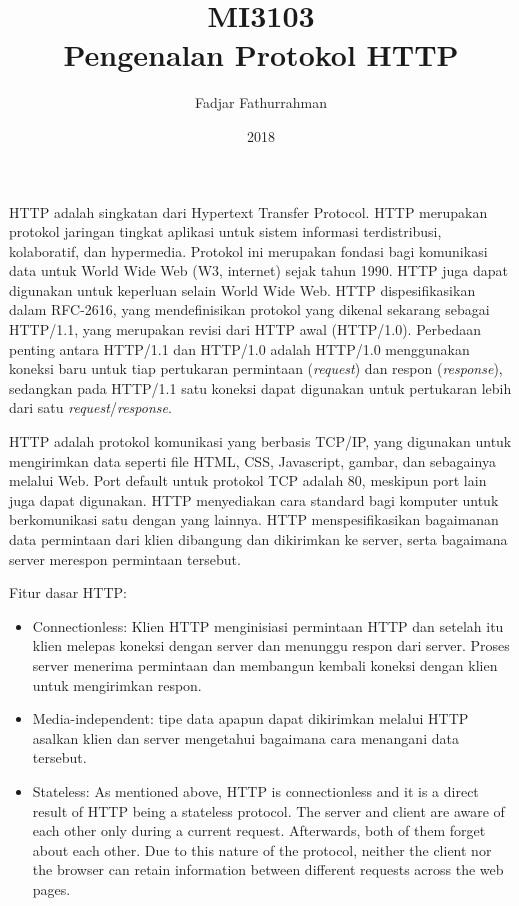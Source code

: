 \documentclass[a4paper,11pt]{extarticle}
\title{
MI3103 \\
Pengenalan Protokol HTTP}
\author{Fadjar Fathurrahman}
\date{2018}
\begin{document}
\maketitle

HTTP adalah singkatan dari Hypertext Transfer Protocol. HTTP merupakan protokol
jaringan tingkat aplikasi untuk sistem informasi terdistribusi, kolaboratif,
dan hypermedia. Protokol ini merupakan fondasi bagi komunikasi data untuk
World Wide Web (W3, internet) sejak tahun 1990. HTTP juga
dapat digunakan untuk keperluan selain World Wide Web.
HTTP dispesifikasikan dalam RFC-2616, yang mendefinisikan protokol yang
dikenal sekarang sebagai HTTP/1.1, yang merupakan revisi dari HTTP awal
(HTTP/1.0). Perbedaan penting antara HTTP/1.1 dan HTTP/1.0 adalah HTTP/1.0
menggunakan koneksi baru untuk tiap pertukaran permintaan (\textit{request})
dan respon (\textit{response}), sedangkan pada HTTP/1.1 satu koneksi
dapat digunakan untuk pertukaran lebih dari satu
\textit{request}/\textit{response}.

HTTP adalah protokol komunikasi yang berbasis TCP/IP, yang digunakan
untuk mengirimkan data seperti file HTML, CSS, Javascript, gambar, dan
sebagainya melalui Web.
Port default untuk protokol TCP adalah 80, meskipun port lain juga dapat
digunakan.
HTTP menyediakan cara standard bagi komputer untuk berkomunikasi
satu dengan yang lainnya.
HTTP menspesifikasikan bagaimanan data permintaan
dari klien dibangung dan dikirimkan ke server, serta bagaimana
server merespon permintaan tersebut.

Fitur dasar HTTP:
\begin{itemize}
\item Connectionless: Klien HTTP menginisiasi permintaan HTTP dan setelah itu klien
melepas koneksi dengan server dan menunggu respon dari server. Proses server
menerima permintaan dan membangun kembali koneksi dengan klien untuk
mengirimkan respon.
\item Media-independent: tipe data apapun dapat dikirimkan melalui HTTP asalkan
klien dan server mengetahui bagaimana cara menangani data tersebut.
\item Stateless: As mentioned above, HTTP is connectionless and it
is a direct result of HTTP being a stateless protocol.
The server and client are aware of each other only during a
current request. Afterwards, both of them forget about each other.
Due to this nature of the protocol, neither the client nor the
browser can retain information between different requests across the web pages.
\end{itemize}
\end{document}

